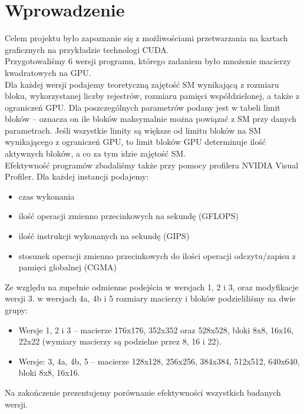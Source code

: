 
\section{Wprowadzenie}

Celem projektu było zapoznanie się z możliwościami przetwarzania na kartach graficznych na przykładzie technologi CUDA. \\

Przygotowaliśmy 6 wersji programu, którego zadaniem było mnożenie macierzy kwadratowych na GPU. \\

Dla każdej wersji podajemy teoretyczną zajętość SM wynikającą z rozmiaru bloku, wykorzystanej liczby rejestrów, rozmiaru pamięci współdzielonej, a także z ograniczeń GPU\@.
Dla poszczególnych parametrów podany jest w tabeli limit bloków -- oznacza on ile bloków maksymalnie można powiązać z SM przy danych parametrach. Jeśli wszystkie limity są większe od limitu bloków na SM wynikającego z ograniczeń GPU, to limit bloków GPU determinuje ilość aktywnych bloków, a co za tym idzie zajętość SM. \\

Efektywność programów zbadaliśmy także przy pomocy profilera NVIDIA Visual Profiler. Dla każdej instancji podajemy:
\begin{itemize}
\item czas wykonania
\item ilość operacji zmienno przecinkowych na sekundę (GFLOPS)
\item ilość instrukcji wykonanych na sekundę (GIPS)
\item stosunek operacji zmienno przecinkowych do ilości operacji odczytu/zapisu z pamięci globalnej (CGMA)
\end{itemize}

Ze względu na zupełnie odmienne podejścia w wersjach 1, 2 i 3, oraz modyfikacje wersji 3. w wersjach 4a, 4b i 5 rozmiary macierzy i bloków podzieliliśmy na dwie grupy:
\begin{itemize}
\item Wersje 1, 2 i 3 -- macierze 176x176, 352x352 oraz 528x528, bloki 8x8, 16x16, 22x22 (wymiary macierzy są podzielne przez 8, 16 i 22).
\item Wersje: 3, 4a, 4b, 5  -- macierze 128x128, 256x256, 384x384, 512x512, 640x640, bloki 8x8, 16x16.
\end{itemize}

Na zakończenie prezentujemy porównanie efektywności wszystkich badanych wersji.

\newpage
